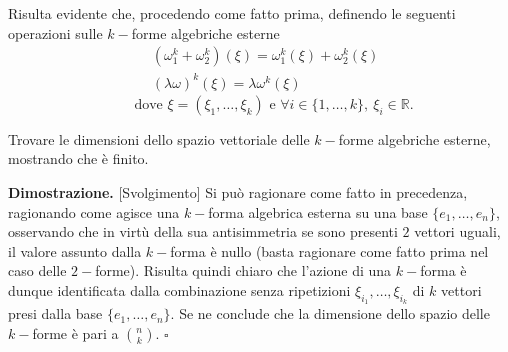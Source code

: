 %
Risulta evidente che, procedendo come fatto prima, definendo le seguenti operazioni sulle $k-$forme algebriche esterne
%
\begin{equation*}
    \begin{aligned}
        &(\omega_1^k + \omega_2^k)(\xi) = \omega_1^k(\xi) + \omega_2^k(\xi) \\
        &(\lambda \omega)^k(\xi) = \lambda \omega^k(\xi)
    \end{aligned}
\end{equation*}
%
\begin{equation*}
	\qquad \text{dove } \xi = (\xi_1, \ldots, \xi_k) \text{ e } \forall i \in \{1, \ldots, k\},\ \xi_i \in \mathbb{R}.
\end{equation*}
%
\vspace{0.5cm}
\begin{exercise}
    Trovare le dimensioni dello spazio vettoriale delle $k-$forme algebriche esterne, mostrando che è finito.
\end{exercise}
%
\noindent \textbf{Dimostrazione. } [Svolgimento]
    Si può ragionare come fatto in precedenza, ragionando come agisce una $k-$forma algebrica esterna su una base $\{ e_1, \ldots, e_n \}$, osservando che in virtù della sua antisimmetria se sono presenti $2$ vettori uguali, il valore assunto dalla $k-$forma è nullo (basta ragionare come fatto prima nel caso delle $2-$forme). Risulta quindi chiaro che l'azione di una $k-$forma è dunque identificata dalla combinazione senza ripetizioni $\xi_{i_1}, \ldots, \xi_{i_k}$ di $k$ vettori presi dalla base $\{ e_1, \ldots, e_n \}$. Se ne conclude che la dimensione dello spazio delle $k-$forme è pari a $\binom{n}{k}$. 
\hfill $\square$
%
\vspace{0.5cm}
